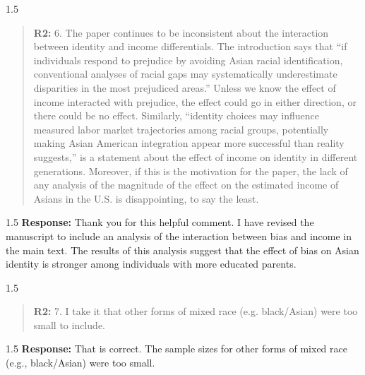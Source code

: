 \documentclass[12pt,english]{article}
\newcommand{\rrxspc}{1.5}
\begin{document}
\begin{refsection}
    \begin{spacing}{\rrxspc}
            \begin{quotation}
                \textbf{R2: } 6. The paper continues to be inconsistent about the interaction between identity and income differentials. The introduction says that “if individuals respond to prejudice by avoiding Asian racial identification, conventional analyses of racial gaps may systematically underestimate
                disparities in the most prejudiced areas.” Unless we know the effect of income interacted with prejudice, the effect could go in either direction, or there
                could be no effect. Similarly, “identity choices may influence measured labor market trajectories among racial groups, potentially making Asian
                American integration appear more successful than reality suggests,” is a statement about the effect of income on identity in different generations.
                Moreover, if this is the motivation for the paper, the lack of any analysis of the magnitude of the effect on the estimated income of Asians in the U.S. is
                disappointing, to say the least.
            \end{quotation}
    \end{spacing}
    \begin{spacing}{\rrxspc}
        \textbf{Response:} Thank you for this helpful comment. I have revised the manuscript to include an analysis of the interaction between bias and income in the main text. The results of this analysis suggest that the effect of bias on Asian identity is stronger among individuals with more educated parents. 
    \end{spacing}

    \begin{spacing}{\rrxspc}
            \begin{quotation}
                \textbf{R2: } 7. I take it that other forms of mixed race (e.g. black/Asian) were too small to include.
            \end{quotation}
    \end{spacing}
    \begin{spacing}{\rrxspc}
        \textbf{Response:} That is correct. The sample sizes for other forms of mixed race (e.g., black/Asian) were too small.
    \end{spacing}


\end{refsection}
\end{document}
